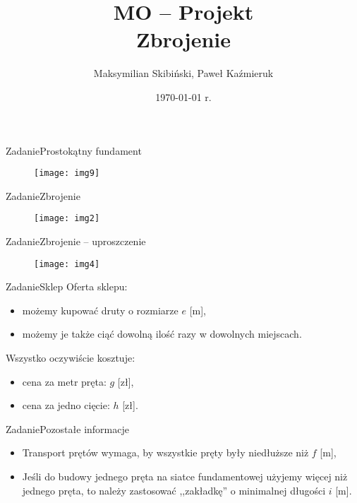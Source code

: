 \documentclass[11pt]{beamer}
\title[MO -- Projekt]{%
	MO -- Projekt \vspace{0.5cm}\\%
	Zbrojenie
}
\author[Skibiński, Kaźmieruk]{Maksymilian Skibiński, Paweł Kaźmieruk}
\date{\today{} r.}
\begin{document}
\frame{\titlepage}



\begin{frame}{Zadanie}{Prostokątny fundament}
\begin{figure}[h!]
	\centering
	\texttt{[image: img9]}
\end{figure}
\end{frame}

\begin{frame}{Zadanie}{Zbrojenie}
\begin{figure}[h!]
	\centering
	\texttt{[image: img2]}
\end{figure}
\end{frame}

\begin{frame}{Zadanie}{Zbrojenie -- uproszczenie}
\begin{figure}[h!]
	\centering
	\texttt{[image: img4]}
\end{figure}
\end{frame}

\begin{frame}{Zadanie}{Sklep}
Oferta sklepu:
\begin{itemize}
\item<1-> możemy kupować druty o rozmiarze $e$ [m],
\item<2-> możemy je także ciąć dowolną ilość razy w dowolnych miejscach.
\end{itemize}

\vspace{0.5cm}

\pause\pause

Wszystko oczywiście kosztuje:
\begin{itemize}
\item[ ] cena za metr pręta: $g$ [zł],
\item[ ] cena za jedno cięcie: $h$ [zł].
\end{itemize}
\end{frame}

\begin{frame}{Zadanie}{Pozostałe informacje}
\begin{itemize}
\item<1-> Transport prętów wymaga, by wszystkie pręty były niedłuższe niż $f$ [m],
\item<2-> Jeśli do budowy jednego pręta na siatce fundamentowej użyjemy więcej niż jednego pręta, to należy zastosować ,,zakładkę'' o minimalnej długości $i$ [m].
\end{itemize}
\end{frame}
\end{document}
